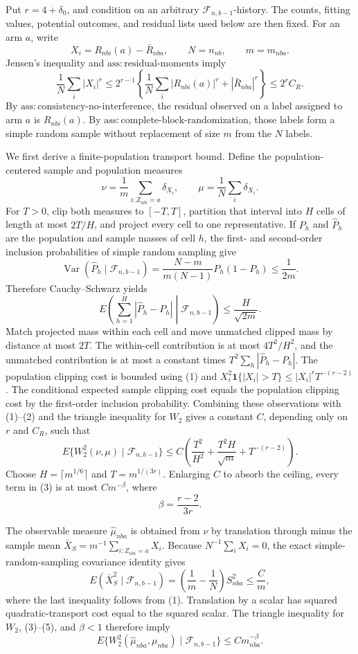 Put \(r=4+\delta_0\), and condition on an arbitrary \(\mathcal F_{n,b-1}\)-history. The counts, fitting values, potential outcomes, and residual lists used below are then fixed. For an arm \(a\), write
\[
X_i=R_{nbi}(a)-\bar R_{nba},\qquad N=n_{nb},\qquad m=m_{nba}.
\]
Jensen's inequality and \(\mathrm{ass:residual\text{-}moments}\) imply
\[
\frac1N\sum_i|X_i|^r
\le2^{r-1}\left\{\frac1N\sum_i|R_{nbi}(a)|^r+|\bar R_{nba}|^r\right\}
\le2^rC_R.
\tag{1}
\]
By \(\mathrm{ass:consistency\text{-}no\text{-}interference}\), the residual observed on a label assigned to arm \(a\) is \(R_{nbi}(a)\). By \(\mathrm{ass:complete\text{-}block\text{-}randomization}\), those labels form a simple random sample without replacement of size \(m\) from the \(N\) labels.

We first derive a finite-population transport bound. Define the population-centered sample and population measures
\[
\nu=\frac1m\sum_{i:Z_{nbi}=a}\delta_{X_i},
\qquad
\mu=\frac1N\sum_i\delta_{X_i}.
\]
For \(T>0\), clip both measures to \([-T,T]\), partition that interval into \(H\) cells of length at most \(2T/H\), and project every cell to one representative. If \(P_h\) and \(\widehat P_h\) are the population and sample masses of cell \(h\), the first- and second-order inclusion probabilities of simple random sampling give
\[
\operatorname{Var}(\widehat P_h\mid\mathcal F_{n,b-1})
=\frac{N-m}{m(N-1)}P_h(1-P_h)\le\frac1{2m}.
\]
Therefore Cauchy--Schwarz yields
\[
E\left(\sum_{h=1}^H|\widehat P_h-P_h|\middle|\mathcal F_{n,b-1}\right)
\le\frac{H}{\sqrt{2m}}.
\tag{2}
\]
Match projected mass within each cell and move unmatched clipped mass by distance at most \(2T\). The within-cell contribution is at most \(4T^2/H^2\), and the unmatched contribution is at most a constant times \(T^2\sum_h|\widehat P_h-P_h|\). The population clipping cost is bounded using (1) and
\(X_i^2\mathbf1\{|X_i|>T\}\le |X_i|^rT^{-(r-2)}\). The conditional expected sample clipping cost equals the population clipping cost by the first-order inclusion probability. Combining these observations with (1)--(2) and the triangle inequality for \(W_2\) gives a constant \(C\), depending only on \(r\) and \(C_R\), such that
\[
E\{W_2^2(\nu,\mu)\mid\mathcal F_{n,b-1}\}
\le C\left(\frac{T^2}{H^2}+\frac{T^2H}{\sqrt m}+T^{-(r-2)}\right).
\tag{3}
\]
Choose \(H=\lceil m^{1/6}\rceil\) and \(T=m^{1/(3r)}\). Enlarging \(C\) to absorb the ceiling, every term in (3) is at most \(Cm^{-\beta}\), where
\[
\beta=\frac{r-2}{3r}.
\tag{4}
\]

The observable measure \(\widehat\mu_{nba}\) is obtained from \(\nu\) by translation through minus the sample mean \(\bar X_S=m^{-1}\sum_{i:Z_{nbi}=a}X_i\). Because \(N^{-1}\sum_iX_i=0\), the exact simple-random-sampling covariance identity gives
\[
E(\bar X_S^2\mid\mathcal F_{n,b-1})
=\left(\frac1m-\frac1N\right)S_{nba}^2\le\frac{C}{m},
\tag{5}
\]
where the last inequality follows from (1). Translation by a scalar has squared quadratic-transport cost equal to the squared scalar. The triangle inequality for \(W_2\), (3)--(5), and \(\beta<1\) therefore imply
\[
E\{W_2^2(\widehat\mu_{nba},\mu_{nba})\mid\mathcal F_{n,b-1}\}
\le Cm_{nba}^{-\beta}.
\tag{6}
\]


